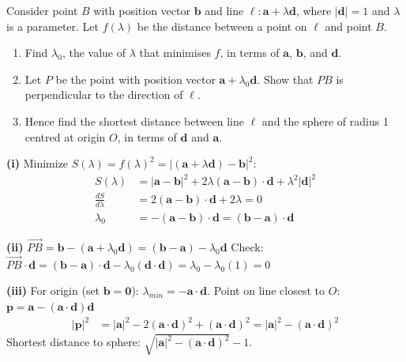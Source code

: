 \vspace{1em}

\begin{problem}
Consider point $B$ with position vector $\mathbf{b}$ and line $\ell: \mathbf{a} + \lambda\mathbf{d}$, where $|\mathbf{d}|=1$ and $\lambda$ is a parameter. Let $f(\lambda)$ be the distance between a point on $\ell$ and point $B$.
\begin{enumerate}[label=(\roman*)]
    \item Find $\lambda_0$, the value of $\lambda$ that minimises $f$, in terms of $\mathbf{a}$, $\mathbf{b}$, and $\mathbf{d}$.
    \item Let $P$ be the point with position vector $\mathbf{a} + \lambda_0\mathbf{d}$. Show that $PB$ is perpendicular to the direction of $\ell$.
    \item Hence find the shortest distance between line $\ell$ and the sphere of radius 1 centred at origin $O$, in terms of $\mathbf{d}$ and $\mathbf{a}$.
\end{enumerate}
\end{problem}

\begin{solution}
\textbf{(i)} Minimize $S(\lambda) = f(\lambda)^2 = |(\mathbf{a} + \lambda\mathbf{d}) - \mathbf{b}|^2$:
\vspace{-2mm}
\begin{align*}
S(\lambda) &= |\mathbf{a} - \mathbf{b}|^2 + 2\lambda(\mathbf{a} - \mathbf{b}) \cdot \mathbf{d} + \lambda^2|\mathbf{d}|^2\\
\tfrac{dS}{d\lambda} &= 2(\mathbf{a} - \mathbf{b}) \cdot \mathbf{d} + 2\lambda = 0\\
\lambda_0 &= -(\mathbf{a} - \mathbf{b}) \cdot \mathbf{d} = (\mathbf{b} - \mathbf{a}) \cdot \mathbf{d}
\end{align*}

\textbf{(ii)} $\vec{PB} = \mathbf{b} - (\mathbf{a} + \lambda_0\mathbf{d}) = (\mathbf{b} - \mathbf{a}) - \lambda_0\mathbf{d}$
Check: $\vec{PB} \cdot \mathbf{d} = (\mathbf{b} - \mathbf{a}) \cdot \mathbf{d} - \lambda_0(\mathbf{d} \cdot \mathbf{d}) = \lambda_0 - \lambda_0(1) = 0$ \checkmark

\textbf{(iii)} For origin (set $\mathbf{b} = \mathbf{0}$): $\lambda_{min} = -\mathbf{a} \cdot \mathbf{d}$.
Point on line closest to $O$: $\mathbf{p} = \mathbf{a} - (\mathbf{a} \cdot \mathbf{d})\mathbf{d}$
\begin{align*}
|\mathbf{p}|^2 &= |\mathbf{a}|^2 - 2(\mathbf{a} \cdot \mathbf{d})^2 + (\mathbf{a} \cdot \mathbf{d})^2 = |\mathbf{a}|^2 - (\mathbf{a} \cdot \mathbf{d})^2
\end{align*}
Shortest distance to sphere: $\sqrt{|\mathbf{a}|^2 - (\mathbf{a} \cdot \mathbf{d})^2} - 1$.
\end{solution}

